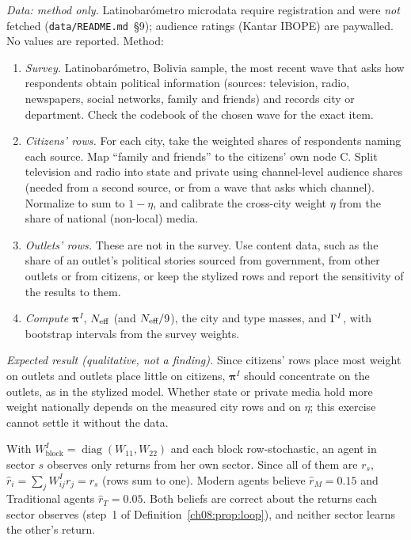 \documentclass[../solutions_manual.tex]{subfiles}
\begin{document}
 \emph{Data: method only.} Latinobar\'ometro microdata require registration and were \emph{not} fetched (\texttt{data/README.md}~\S9); audience ratings (Kantar IBOPE) are paywalled. No values are reported. Method:
\begin{enumerate}
\item \emph{Survey.} Latinobar\'ometro, Bolivia sample, the most recent wave that asks how respondents obtain political information (sources: television, radio, newspapers, social networks, family and friends) and records city or department. Check the codebook of the chosen wave for the exact item.
\item \emph{Citizens' rows.} For each city, take the weighted shares of respondents naming each source. Map ``family and friends'' to the citizens' own node C. Split television and radio into state and private using channel-level audience shares (needed from a second source, or from a wave that asks which channel). Normalize to sum to $1 - \eta$, and calibrate the cross-city weight $\eta$ from the share of national (non-local) media.
\item \emph{Outlets' rows.} These are not in the survey. Use content data, such as the share of an outlet's political stories sourced from government, from other outlets or from citizens, or keep the stylized rows and report the sensitivity of the results to them.
\item \emph{Compute} $\boldsymbol{\pi}^I$, $N_{\text{eff}}$ (and $N_{\text{eff}}/9$), the city and type masses, and $\Gamma^I$, with bootstrap intervals from the survey weights.
\end{enumerate}
\emph{Expected result (qualitative, not a finding).} Since citizens' rows place most weight on outlets and outlets place little on citizens, $\boldsymbol{\pi}^I$ should concentrate on the outlets, as in the stylized model. Whether state or private media hold more weight nationally depends on the measured city rows and on $\eta$; this exercise cannot settle it without the data.


 With $W^I_{\text{block}} = \operatorname{diag}(W_{11}, W_{22})$ and each block row-stochastic, an agent in sector $s$ observes only returns from her own sector. Since all of them are $r_s$, $\hat r_i = \sum_jW^I_{ij}r_j = r_s$ (rows sum to one). Modern agents believe $\hat r_M = 0.15$ and Traditional agents $\hat r_T = 0.05$. Both beliefs are correct about the returns each sector observes (step~1 of Definition~\ref{ch08:prop:loop}), and neither sector learns the other's return.
\end{document}
